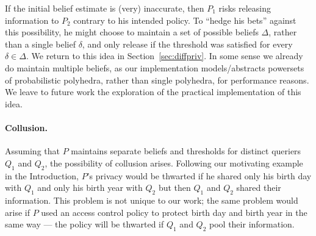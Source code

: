 
If the initial belief estimate is (very) inaccurate, then $P_1$ risks
releasing information to $P_2$ contrary to his intended policy.  To
``hedge his bets'' against this possibility, he might choose to
maintain a set of possible beliefs $\Delta$, rather than a single
belief $\delta$, and only release if the threshold was satisfied for
every $\delta \in \Delta$.  We return to this idea in
Section~\ref{sec:diffpriv}. In some sense we already do maintain
multiple beliefs, as our implementation models/abstracts powersets of
probabilistic polyhedra, rather than single polyhedra, for performance
reasons.  We leave to future work the exploration of the practical
implementation of this idea.

\paragraph*{Collusion.}

Assuming that $P$ maintains separate beliefs and thresholds for
distinct queriers $Q_1$ and $Q_2$, the possibility of collusion
arises.  Following our motivating example in the Introduction, $P$'s
privacy would be thwarted if he shared only his birth day with $Q_1$
and only his birth year with $Q_2$ but then $Q_1$ and $Q_2$ shared
their information. This problem is not unique to our work; the same
problem would arise if $P$ used an access control policy to protect
birth day and birth year in the same way --- the policy will be
thwarted if $Q_1$ and $Q_2$ pool their information.

